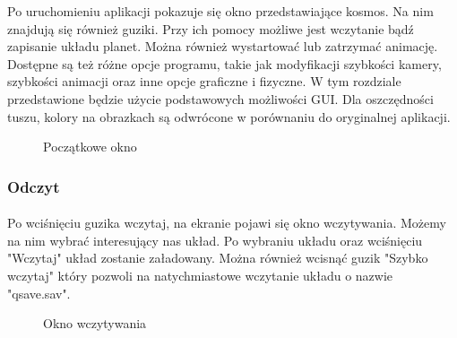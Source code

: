 Po uruchomieniu aplikacji pokazuje się okno przedstawiające kosmos. Na nim znajdują się również guziki. Przy ich pomocy możliwe jest wczytanie bądź zapisanie układu planet. Można również wystartować lub zatrzymać animację. Dostępne są też różne opcje programu, takie jak modyfikacji szybkości kamery, szybkości animacji oraz inne opcje graficzne i fizyczne. W tym rozdziale przedstawione będzie użycie podstawowych możliwości GUI. Dla oszczędności tuszu, kolory na obrazkach są odwrócone w porównaniu do oryginalnej aplikacji.

\begin{figure}[ht!]
\centering
{}
\caption{Początkowe okno}
\label{fig:inst_00}
\end{figure}

\subsubsection{Odczyt}\label{ssub:odczyt}
\paragraph{}

Po wciśnięciu guzika wczytaj, na ekranie pojawi się okno wczytywania. Możemy na nim wybrać interesujący nas układ. Po wybraniu układu oraz wciśnięciu "Wczytaj" układ zostanie załadowany. Można również wcisnąć guzik "Szybko wczytaj" który pozwoli na natychmiastowe wczytanie układu o nazwie "qsave.sav".

\begin{figure}[ht!]
\centering
{}
\caption{Okno wczytywania}
\label{fig:inst_01}
\end{figure}

